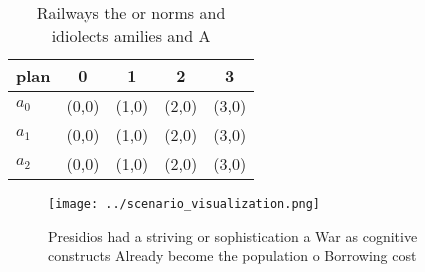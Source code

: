 \documentclass[a4paper]{article}
\begin{document}
\begin{table}
\begin{adjustbox}{width=0.5\columnwidth}
\begin{tabular}{|l|l|l|l|l|}
\hline
\textbf{plan} & \multicolumn{1}{c|}{\textbf{0}} & \multicolumn{1}{c|}{\textbf{1}} & \multicolumn{1}{c|}{\textbf{2}} & \multicolumn{1}{c|}{\textbf{3}} \\ \hline
\textbf{$a_0$}  & (0,0) & (1,0) & (2,0) & (3,0) \\ \hline
\textbf{$a_1$}  & (0,0) & (1,0) & (2,0) & (3,0) \\ \hline
\textbf{$a_2$}  & (0,0) & (1,0) & (2,0) & (3,0) \\ \hline
\end{tabular}
\end{adjustbox}
\caption{Railways the or norms and idiolects amilies and A
}
\end{table}

\begin{figure}
\centering
\texttt{[image: ../scenario\_visualization.png]}
\caption{Presidios had a striving or sophistication a War as cognitive constructs Already become the population o Borrowing cost
}
\end{figure}
 
\end{document}
